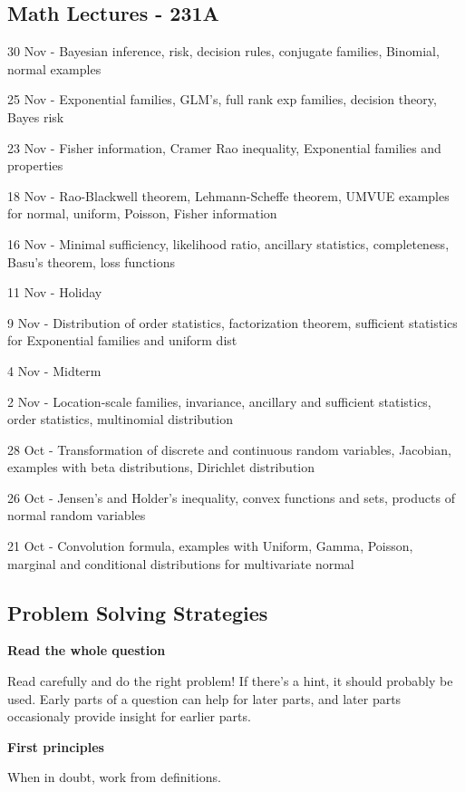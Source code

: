 \documentclass[10pt, twocolumn]{article}
\begin{document}
\subsection*{Math Lectures - 231A}

30 Nov - Bayesian inference, risk, decision rules, conjugate families,
Binomial, normal examples

25 Nov - Exponential families, GLM's, full rank exp families, decision
theory, Bayes risk

23 Nov - Fisher information, Cramer Rao inequality, Exponential families
and properties

18 Nov - Rao-Blackwell theorem, Lehmann-Scheffe theorem, UMVUE examples for
normal, uniform, Poisson, Fisher information

16 Nov - Minimal sufficiency, likelihood ratio, ancillary statistics,
completeness, Basu's theorem, loss functions

11 Nov - Holiday

9 Nov - Distribution of order statistics, factorization theorem, sufficient
statistics for Exponential families and uniform dist

4 Nov - Midterm

2 Nov - Location-scale families, invariance, ancillary and sufficient
statistics, order statistics, multinomial distribution

28 Oct - Transformation of discrete and continuous random variables,
Jacobian, examples with beta distributions, Dirichlet distribution

26 Oct - Jensen's and Holder's inequality, convex functions and sets,
products of normal random variables

21 Oct - Convolution formula, examples with Uniform, Gamma, Poisson,
marginal and conditional distributions for multivariate normal
\newpage

\subsection*{Problem Solving Strategies}

\textbf{Read the whole question}

Read carefully and do the right problem! If there's a hint, it should
probably be used. Early parts of a question can help for later parts, and later
parts occasionaly provide insight for earlier parts.

\textbf{First principles}

When in doubt, work from definitions.
\end{document}
